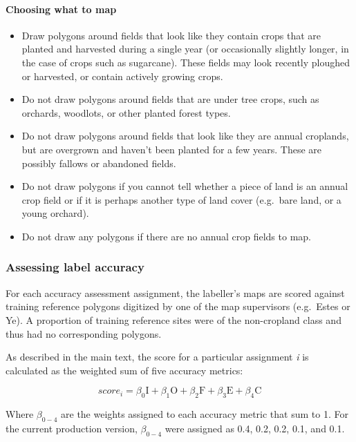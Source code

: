 \documentclass[
  11pt,
  a4paper]{article}
\begin{document}
\hypertarget{choosing-what-to-map}{%
\paragraph{Choosing what to map}\label{choosing-what-to-map}}

\begin{itemize}
\item
  Draw polygons around fields that look like they contain crops that are
  planted and harvested during a single year (or occasionally slightly
  longer, in the case of crops such as sugarcane). These fields may look
  recently ploughed or harvested, or contain actively growing crops.
\item
  Do not draw polygons around fields that are under tree crops, such as
  orchards, woodlots, or other planted forest types.
\item
  Do not draw polygons around fields that look like they are annual
  croplands, but are overgrown and haven't been planted for a few years.
  These are possibly fallows or abandoned fields.
\item
  Do not draw polygons if you cannot tell whether a piece of land is an
  annual crop field or if it is perhaps another type of land cover
  (e.g.~bare land, or a young orchard).
\item
  Do not draw any polygons if there are no annual crop fields to map.
\end{itemize}

\hypertarget{assessing-label-accuracy}{%
\subsubsection{Assessing label
accuracy}\label{assessing-label-accuracy}}

For each accuracy assessment assignment, the labeller's maps are scored
against training reference polygons digitized by one of the map
supervisors (e.g.~Estes or Ye). A proportion of training reference sites
were of the non-cropland class and thus had no corresponding polygons.

As described in the main text, the score for a particular assignment
\emph{i} is calculated as the weighted sum of five accuracy metrics:

\[ score_i=\beta_0\mathrm{I}+\beta_1\mathrm{O}+\beta_2\mathrm{F}+\beta_3\mathrm{E}+\beta_4\mathrm{C}\]

Where \(\beta_{0-4}\) are the weights assigned to each accuracy metric
that sum to 1. For the current production version, \(\beta_{0-4}\) were
assigned as 0.4, 0.2, 0.2, 0.1, and 0.1.
\end{document}
